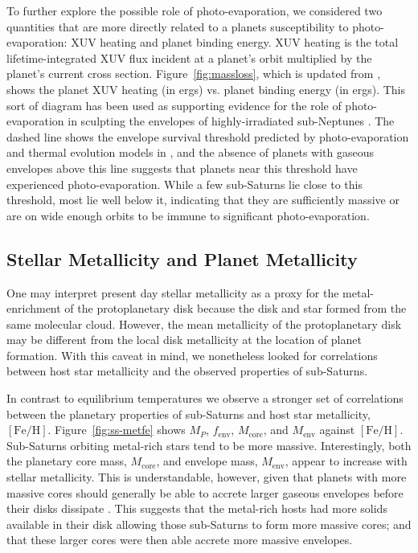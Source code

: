 \documentclass[preprint2]{aastex6}
\newcommand{\fe}{\ensuremath{\mathrm{[Fe/H]}}\xspace}
\newcommand{\Mp}{\ensuremath{M_{P}}\xspace}
\newcommand{\Mcore}{\ensuremath{M_{\mathrm{core}}}\xspace}
\newcommand{\Menv}{\ensuremath{M_{\mathrm{env}}}\xspace}
\newcommand{\fenv}{\ensuremath{f_{\mathrm{env}}}\xspace}
\begin{document}
To further explore the possible role of photo-evaporation, we considered two quantities that are more directly related to a planets susceptibility to photo-evaporation: XUV heating and planet binding energy. XUV heating is the total lifetime-integrated XUV flux incident at a planet's orbit multiplied by the planet's current cross section. Figure~\ref{fig:massloss}, which is updated from \citep{Lopez14}, shows the planet XUV heating (in ergs) vs. planet binding energy (in ergs). This sort of diagram has been used as supporting evidence for the role of photo-evaporation in sculpting the envelopes of highly-irradiated sub-Neptunes \citep{Lecavelier07,lopez:2012,Owen13}. The dashed line shows the envelope survival threshold predicted by photo-evaporation and thermal evolution models in \citet{lopez:2012}, and the absence of planets with gaseous envelopes above this line suggests that planets near this threshold have experienced photo-evaporation. While a few sub-Saturns lie close to this threshold, most lie well below it, indicating that they are sufficiently massive or are on wide enough orbits to be immune to significant photo-evaporation. 

\subsection{Stellar Metallicity and Planet Metallicity}
One may interpret present day stellar metallicity as a proxy for the metal-enrichment of the protoplanetary disk because the disk and star formed from the same molecular cloud. However, the mean metallicity of the protoplanetary disk may be different from the local disk metallicity at the location of planet formation. With this caveat in mind, we nonetheless looked for correlations between host star metallicity and the observed properties of sub-Saturns.

In contrast to equilibrium temperatures we observe a stronger set of correlations between the planetary properties of sub-Saturns and host star metallicity, \fe. Figure~\ref{fig:ss-metfe} shows \Mp, \fenv, \Mcore, and \Menv against \fe. Sub-Saturns orbiting metal-rich stars tend to be more massive. Interestingly, both the planetary core mass, \Mcore, and envelope mass, \Menv, appear to increase with stellar metallicity. This is understandable, however, given that planets with more massive cores should generally be able to accrete larger gaseous envelopes before their disks dissipate \citep{Lee15a}. This suggests that the metal-rich hosts had more solids available in their disk allowing those sub-Saturns to form more massive cores; and that these larger cores were then able accrete more massive envelopes. 
\end{document}
